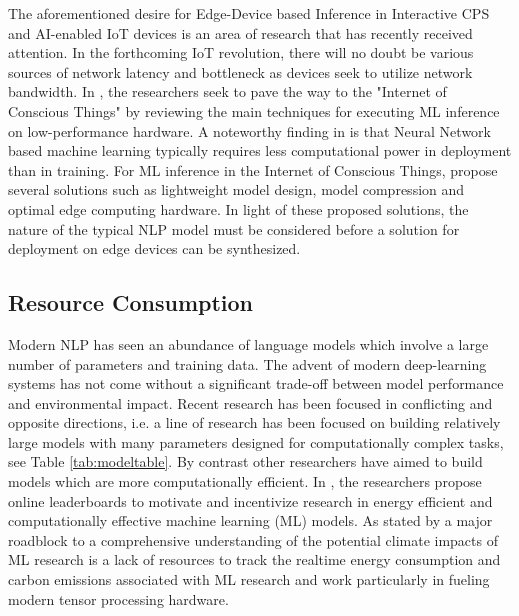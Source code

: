 \documentclass{sigchi}
\begin{document}
\par The aforementioned desire for Edge-Device based Inference in Interactive CPS and AI-enabled IoT devices is an area of research that has recently received attention. In the forthcoming IoT revolution, there will no doubt be various sources of network latency and bottleneck as devices seek to utilize network bandwidth. In \cite{edgeml}, the researchers seek to pave the way to the "Internet of Conscious Things" by reviewing the main techniques for executing ML inference on low-performance hardware. A noteworthy finding in \cite{edgeml} is that Neural Network based machine learning typically requires less computational power in deployment than in training. For ML inference in the Internet of Conscious Things, \cite{edgeml} propose several solutions such as lightweight model design, model compression and optimal edge computing hardware. In light of these proposed solutions, the nature of the typical NLP model must be considered before a solution for deployment on edge devices can be synthesized.

\subsection{Resource Consumption}
Modern NLP has seen an abundance of language models which involve a large number of parameters and training data. \cite{stochasticparrots} The advent of modern deep-learning systems has not come without a significant trade-off between model performance and environmental impact. Recent research has been focused in conflicting and opposite directions, i.e. a line of research has been focused on building relatively large models with many parameters designed for computationally complex tasks, see Table \ref{tab:modeltable}. By contrast other researchers have aimed to build models which are more computationally efficient. In \cite{systematic}, the researchers propose online leaderboards to motivate and incentivize research in energy efficient and computationally effective machine learning (ML) models. As stated by \cite{systematic} a major roadblock to a comprehensive understanding of the potential climate impacts of ML research is a lack of resources to track the realtime energy consumption and carbon emissions associated with ML research and work particularly in fueling modern tensor processing hardware. 
\end{document}
